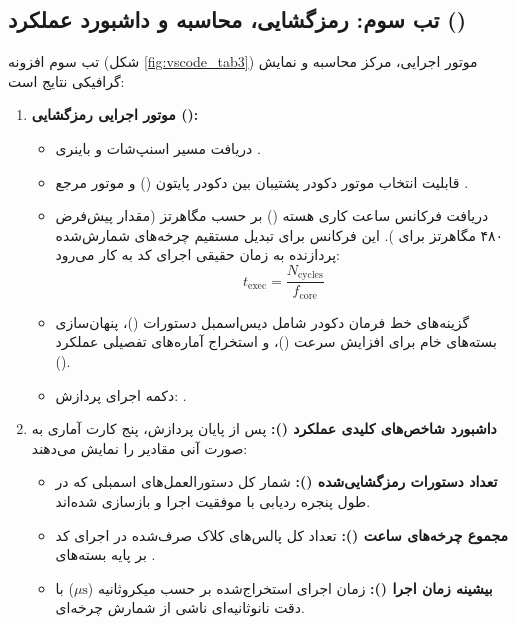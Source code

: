 \subsection[تب سوم: دکود، استخراج \lr{WCET} و داشبورد]{تب سوم: رمزگشایی، محاسبه  و داشبورد عملکرد ()}
تب سوم افزونه (شکل \ref{fig:vscode_tab3}) موتور اجرایی، مرکز محاسبه  و نمایش گرافیکی نتایج است:
\begin{enumerate}
    \item \textbf{موتور اجرایی رمزگشایی ():}
    \begin{itemize}
        \item دریافت مسیر اسنپ‌شات و باینری .
        \item قابلیت انتخاب موتور دکودر پشتیبان بین دکودر پایتون () و موتور مرجع .
        \item دریافت فرکانس ساعت کاری هسته () بر حسب مگاهرتز (مقدار پیش‌فرض ۴۸۰ مگاهرتز برای ). این فرکانس برای تبدیل مستقیم چرخه‌های شمارش‌شده پردازنده به زمان حقیقی اجرای کد به کار می‌رود:
        \begin{equation}
        t_{\mathrm{exec}} = \frac{N_{\mathrm{cycles}}}{f_{\mathrm{core}}}
        \end{equation}
        \item گزینه‌های خط فرمان دکودر شامل دیس‌اسمبل دستورات ()، پنهان‌سازی بسته‌های خام برای افزایش سرعت ()، و استخراج آماره‌های تفصیلی عملکرد ().
        \item دکمه اجرای پردازش: .
    \end{itemize}
    \item \textbf{داشبورد شاخص‌های کلیدی عملکرد ():} پس از پایان پردازش، پنج کارت آماری به صورت آنی مقادیر را نمایش می‌دهند:
    \begin{itemize}
        \item \textbf{تعداد دستورات رمزگشایی‌شده ():} شمار کل دستورالعمل‌های اسمبلی که در طول پنجره ردیابی با موفقیت اجرا و بازسازی شده‌اند.
        \item \textbf{مجموع چرخه‌های ساعت ():} تعداد کل پالس‌های کلاک صرف‌شده در اجرای کد بر پایه بسته‌های .
        \item \textbf{بیشینه زمان اجرا ():} زمان اجرای استخراج‌شده بر حسب میکروثانیه ($\mu\mathrm{s}$) با دقت نانوثانیه‌ای ناشی از شمارش چرخه‌ای.

\end{itemize}
\end{enumerate}
